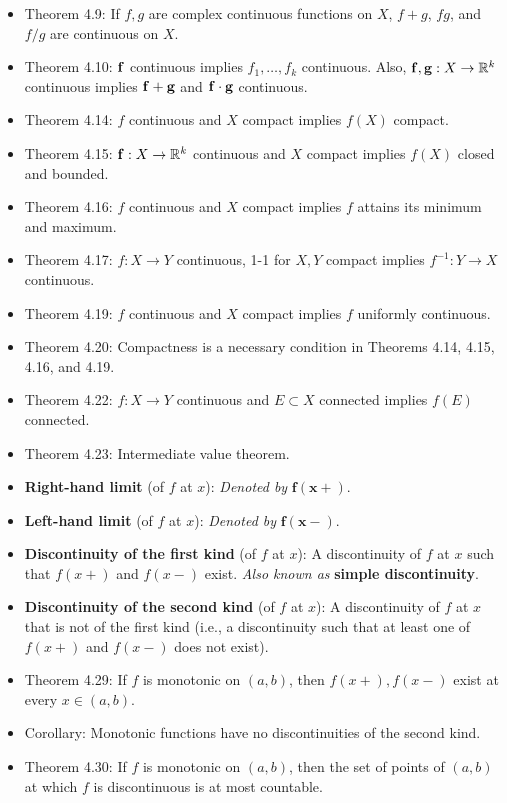 \documentclass[../../notes.tex]{subfiles}
\begin{document}
\begin{itemize}
    \item Theorem 4.9: If $f,g$ are complex continuous functions on $X$, $f+g$, $fg$, and $f/g$ are continuous on $X$.
    \item Theorem 4.10: $\mathbf{f}$ continuous implies $f_1,\dots,f_k$ continuous. Also, $\mathbf{f},\mathbf{g}:X\to\mathbb{R}^k$ continuous implies $\mathbf{f}+\mathbf{g}$ and $\mathbf{f}\cdot\mathbf{g}$ continuous.
    \item {}Theorem 4.14: $f$ continuous and $X$ compact implies $f(X)$ compact.
    \item Theorem 4.15: $\mathbf{f}:X\to\mathbb{R}^k$ continuous and $X$ compact implies $f(X)$ closed and bounded.
    \item Theorem 4.16: $f$ continuous and $X$ compact implies $f$ attains its minimum and maximum.
    \item Theorem 4.17: $f:X\to Y$ continuous, 1-1 for $X,Y$ compact implies $f^{-1}:Y\to X$ continuous.
    \item Theorem 4.19: $f$ continuous and $X$ compact implies $f$ uniformly continuous.
    \item Theorem 4.20: Compactness is a necessary condition in Theorems 4.14, 4.15, 4.16, and 4.19.
    \item Theorem 4.22: $f:X\to Y$ continuous and $E\subset X$ connected implies $f(E)$ connected.
    \item Theorem 4.23: Intermediate value theorem.
    \item \textbf{Right-hand limit} (of $f$ at $x$): \emph{Denoted by} $\bm{f(x+)}$.
    \item \textbf{Left-hand limit} (of $f$ at $x$): \emph{Denoted by} $\bm{f(x-)}$.
    \item \textbf{Discontinuity of the first kind} (of $f$ at $x$): A discontinuity of $f$ at $x$ such that $f(x+)$ and $f(x-)$ exist. \emph{Also known as} \textbf{simple discontinuity}.
    \item \textbf{Discontinuity of the second kind} (of $f$ at $x$): A discontinuity of $f$ at $x$ that is not of the first kind (i.e., a discontinuity such that at least one of $f(x+)$ and $f(x-)$ does not exist).
    \item Theorem 4.29: If $f$ is monotonic on $(a,b)$, then $f(x+),f(x-)$ exist at every $x\in(a,b)$.
    \item Corollary: Monotonic functions have no discontinuities of the second kind.
    \item Theorem 4.30: If $f$ is monotonic on $(a,b)$, then the set of points of $(a,b)$ at which $f$ is discontinuous is at most countable.

\end{itemize}
\end{document}
